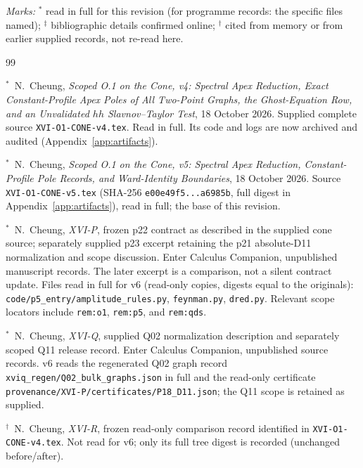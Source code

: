 \documentclass[11pt,a4paper]{article}
\newcommand{\loc}[1]{\nolinkurl{#1}}
\theoremstyle{plain}
\theoremstyle{definition}
\theoremstyle{remark}
\numberwithin{equation}{section}
\begin{document}
\noindent\emph{Marks:} \(^{*}\) read in full for this revision
(for programme records: the specific files named);
\(^{\ddagger}\) bibliographic details confirmed online;
\(^{\dagger}\) cited from memory or from earlier supplied records,
not re-read here.
\medskip
\begin{thebibliography}{99}

\(^{*}\)\ N.~Cheung,
\emph{Scoped O.1 on the Cone, v4:
Spectral Apex Reduction, Exact Constant-Profile Apex Poles of All
Two-Point Graphs, the Ghost-Equation Row, and an Unvalidated
\(hh\) Slavnov--Taylor Test},
18 October 2026.
Supplied complete source \loc{XVI-O1-CONE-v4.tex}.
Read in full. Its code and logs are now archived and audited
(Appendix~\ref{app:artifacts}).

\(^{*}\)\ N.~Cheung,
\emph{Scoped O.1 on the Cone, v5: Spectral Apex Reduction,
Constant-Profile Pole Records, and Ward-Identity Boundaries},
18 October 2026. Source \loc{XVI-O1-CONE-v5.tex}
(SHA-256 \loc{e00e49f5...a6985b}, full digest in
Appendix~\ref{app:artifacts}), read in full; the base of this revision.

\(^{*}\)\ N.~Cheung,
\emph{XVI-P},
frozen p22 contract as described in the supplied cone source;
separately supplied p23 excerpt retaining the p21 absolute-D11
normalization and scope discussion.
Enter Calculus Companion, unpublished manuscript records.
The later excerpt is a comparison, not a silent contract update.
Files read in full for v6 (read-only copies, digests equal to the
originals): \loc{code/p5_entry/amplitude_rules.py},
\loc{feynman.py}, \loc{dred.py}.
Relevant scope locators include
\loc{rem:o1}, \loc{rem:p5}, and \loc{rem:qds}.

\(^{*}\)\ N.~Cheung,
\emph{XVI-Q},
supplied Q02 normalization description and separately scoped
Q11 release record.
Enter Calculus Companion, unpublished source records.
v6 reads the regenerated Q02 graph record
\loc{xviq_regen/Q02_bulk_graphs.json} in full and the
read-only certificate \loc{provenance/XVI-P/certificates/P18_D11.json};
the Q11 scope is retained as supplied.

\(^{\dagger}\)\ N.~Cheung,
\emph{XVI-R},
frozen read-only comparison record identified in
\loc{XVI-O1-CONE-v4.tex}.
Not read for v6; only its full tree digest is recorded
(unchanged before/after).


\end{thebibliography}
\end{document}

